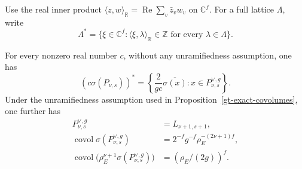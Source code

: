Use the real inner product
$\langle z,w\rangle_{\mathbb R}
   =\operatorname{Re}\sum_v\bar z_vw_v$ on $\mathbb C^f$.
For a full lattice $\Lambda$, write
\[
 \Lambda^*=\{\xi\in\mathbb C^f:
       \langle\xi,\lambda\rangle_{\mathbb R}\in\mathbb Z
                       \text{ for every }\lambda\in\Lambda\}.
\]

\begin{proposition}\label{gt-Fourier-dual}
For every nonzero real number $c$, without any unramifiedness
assumption, one has
\begin{equation}\label{gt-Fourier-dual-eq}
 (c\sigma(P_{\nu,s}))^*
       =\left\{\frac2{gc}\overline{\sigma(x)}:
                             x\in P_{\nu,s}^{\vee,g}\right\}.
\end{equation}
Under the unramifiedness assumption used in
Proposition~\ref{gt-exact-covolumes}, one further has
\begin{align}
 P_{\nu,s}^{\vee,g}&=L_{\nu+1,s+1},
                 \label{gt-exact-trace-dual}\\
 \operatorname{covol}\sigma(P_{\nu,s}^{\vee,g})
       &=2^{-f}g^{-f}\rho_E^{-(2\nu+1)f},
                 \label{gt-dual-covol}\\
 \operatorname{covol}\bigl(\rho_E^{\nu+1}
                       \sigma(P_{\nu,s}^{\vee,g})\bigr)
       &=(\rho_E/(2g))^f.
                 \label{gt-normalized-dual-covol}
\end{align}
\end{proposition}


